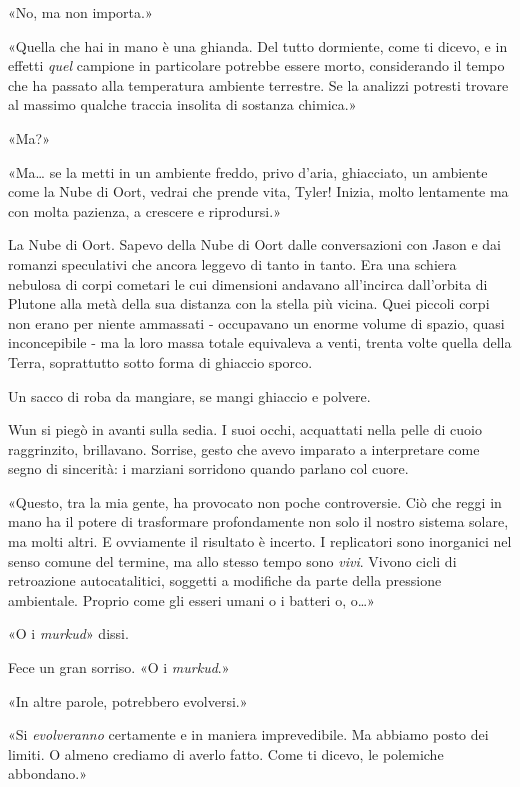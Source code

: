 «No, ma non importa.»

«Quella che hai in mano è una ghianda. Del tutto dormiente, come ti
dicevo, e in effetti \emph{quel} campione in particolare potrebbe essere
morto, considerando il tempo che ha passato alla temperatura ambiente
terrestre. Se la analizzi potresti trovare al massimo qualche traccia
insolita di sostanza chimica.»

«Ma?»

«Ma\ldots{} se la metti in un ambiente freddo, privo d'aria, ghiacciato,
un ambiente come la Nube di Oort, vedrai che prende vita, Tyler! Inizia,
molto lentamente ma con molta pazienza, a crescere e riprodursi.»

La Nube di Oort. Sapevo della Nube di Oort dalle conversazioni con Jason
e dai romanzi speculativi che ancora leggevo di tanto in tanto. Era una
schiera nebulosa di corpi cometari le cui dimensioni andavano
all'incirca dall'orbita di Plutone alla metà della sua distanza con la
stella più vicina. Quei piccoli corpi non erano per niente ammassati -
occupavano un enorme volume di spazio, quasi inconcepibile - ma la loro
massa totale equivaleva a venti, trenta volte quella della Terra,
soprattutto sotto forma di ghiaccio sporco.

Un sacco di roba da mangiare, se mangi ghiaccio e polvere.

Wun si piegò in avanti sulla sedia. I suoi occhi, acquattati nella pelle
di cuoio raggrinzito, brillavano. Sorrise, gesto che avevo imparato a
interpretare come segno di sincerità: i marziani sorridono quando
parlano col cuore.

«Questo, tra la mia gente, ha provocato non poche controversie. Ciò che
reggi in mano ha il potere di trasformare profondamente non solo il
nostro sistema solare, ma molti altri. E ovviamente il risultato è
incerto. I replicatori sono inorganici nel senso comune del termine, ma
allo stesso tempo sono \emph{vivi}. Vivono cicli di retroazione
autocatalitici, soggetti a modifiche da parte della pressione
ambientale. Proprio come gli esseri umani o i batteri o, o\ldots»

«O i \emph{murkud}» dissi.

Fece un gran sorriso. «O i \emph{murkud}.»

«In altre parole, potrebbero evolversi.»

«Si \emph{evolveranno} certamente e in maniera imprevedibile. Ma abbiamo
posto dei limiti. O almeno crediamo di averlo fatto. Come ti dicevo, le
polemiche abbondano.»

